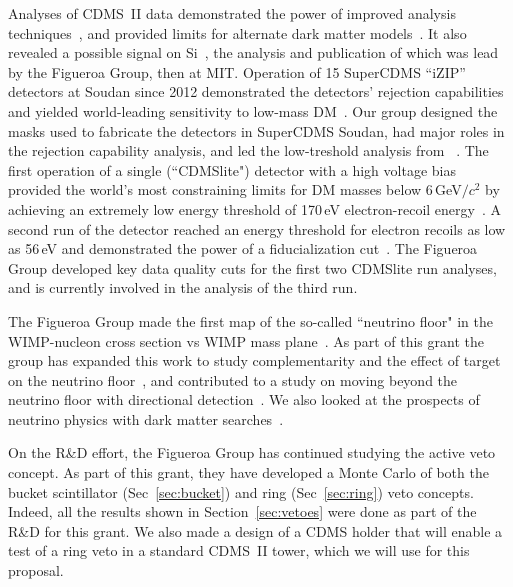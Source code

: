 Analyses of CDMS~II data demonstrated the power of improved analysis techniques~\cite{Agnese:2014xye,Agnese:2015ywx}, and provided limits for alternate dark matter models~\cite{Agnese:2014vxh}. It also revealed a possible signal on Si~\cite{Agnese:13prl}, the analysis and publication of which was lead by the Figueroa Group, then at MIT. 
Operation of 15 SuperCDMS ``iZIP'' detectors at Soudan since 2012 demonstrated the detectors' rejection capabilities~\cite{Agnese:13apl} and yielded world-leading sensitivity to low-mass 
DM~\cite{Agnese:13prl2,Agnese:2014aze,Agnese:2015nto}.  Our group designed the masks used to fabricate the detectors in SuperCDMS Soudan, had major roles in the rejection capability analysis, and led the low-treshold analysis \cite{Agnese:2014aze} from \SuperCDMS\ \Soudan.
The first operation of a single (``CDMSlite") detector with a high voltage bias provided the world's most constraining limits for DM masses below 6\,GeV$/c^2$ by achieving an extremely low energy threshold of 170\,eV electron-recoil energy~\cite{Agnese:13prl2}. A second run of the detector reached an energy threshold for electron recoils as low as 56\,eV and demonstrated the power of a fiducialization cut~\cite{Agnese:2015nto}. The Figueroa Group developed key data quality cuts for the first two CDMSlite run analyses, and is currently involved in the analysis of the third run.
 
 The Figueroa Group made the first map of the so-called ``neutrino floor" in the WIMP-nucleon cross section vs WIMP mass plane~\cite{Billard:14prd}. As part of this grant the group has expanded this work to study complementarity and the effect of target on the neutrino floor~\cite{Ruppin:2014bra}, and contributed to a study on moving beyond the neutrino floor with directional detection~\cite{OHare2015Readout-strateg}. We also looked at the prospects of neutrino physics with dark matter searches~\cite{2015PhRvD..91i5023B}.
 
On the R\&D effort, the Figueroa Group has continued studying the active veto concept. As part of this grant, they have developed a \geant Monte Carlo of both the bucket scintillator (Sec~\ref{sec:bucket}) and ring (Sec~\ref{sec:ring}) veto concepts. Indeed, all the results shown in Section~\ref{sec:vetoes} were done as part of the R\&D for this grant. We also made a design of a CDMS holder that will enable a test of a ring veto in a standard CDMS~II tower, which we will use for this proposal.

